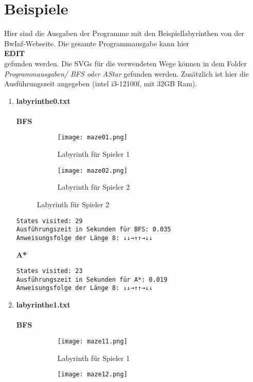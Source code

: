 \documentclass[a4paper,10pt,ngerman]{scrartcl}
\begin{document}
\section{Beispiele}
Hier sind die Ausgaben der Programme mit den Beispiellabyrinthen von der BwInf-Webseite. Die gesamte Programmausgabe kann hier \\
\textbf{EDIT}\\
gefunden werden. Die SVGs für die verwendeten Wege können in dem Folder \textit{Programmausgaben/ BFS oder AStar} gefunden werden. Zusätzlich ist hier die Ausführungszeit angegeben (intel i3-12100f, mit 32GB Ram).

\begin{enumerate}
  \item \textbf{labyrinthe0.txt}\\
\\\textbf{BFS}
\begin{figure}[H]
    \centering
    \begin{subfigure}{0.45\textwidth}
        \centering
        \texttt{[image: maze01.png]} 
        \caption{Labyrinth für Spieler 1}
    \end{subfigure}
    \hfill
    \begin{subfigure}{0.45\textwidth}
        \centering
        \texttt{[image: maze02.png]}
        \caption{Labyrinth für Spieler 2}
    \end{subfigure}
\end{figure}
  \begin{verbatim}
States visited: 29
Ausführungszeit in Sekunden für BFS: 0.035
Anweisungsfolge der Länge 8: ↓↓→↑↑→↓↓
  \end{verbatim}
\textbf{A*}
\begin{verbatim}
States visited: 23
Ausführungszeit in Sekunden für A*: 0.019
Anweisungsfolge der Länge 8: ↓↓→↑↑→↓↓
\end{verbatim}
  \item \textbf{labyrinthe1.txt}\\
\\\textbf{BFS}
\begin{figure}[H]
    \centering
    \begin{subfigure}{0.45\textwidth}
        \centering
        \texttt{[image: maze11.png]} 
        \caption{Labyrinth für Spieler 1}
    \end{subfigure}
    \hfill
    \begin{subfigure}{0.45\textwidth}
        \centering
        \texttt{[image: maze12.png]}

\end{subfigure}
\end{figure}
\end{enumerate}
\end{document}
